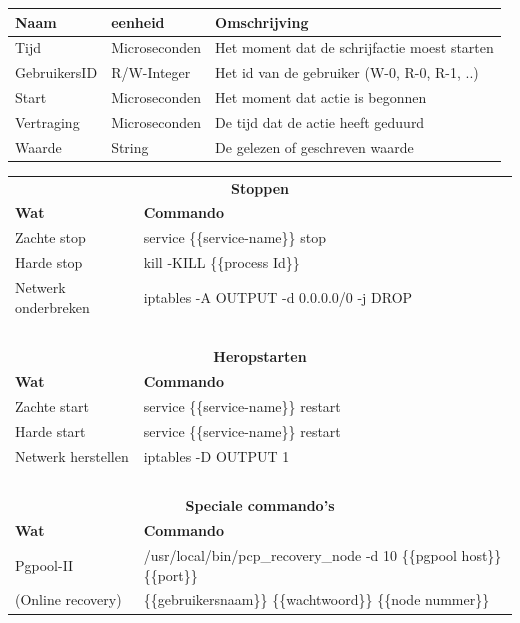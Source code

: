 \begin{table}[htbf]
\centering
		\begin{tabular}{l|l|l}
			\textbf{Naam} & \textbf{eenheid} & \textbf{Omschrijving} \\ 
			\hline Tijd & Microseconden & Het moment dat de schrijfactie moest starten\\ 
			GebruikersID & R/W-Integer & Het id van de gebruiker (W-0, R-0, R-1, ..) \\ 
			Start & Microseconden & Het moment dat actie is begonnen \\
			Vertraging & Microseconden & De tijd dat de actie heeft geduurd \\ 
			Waarde & String & De gelezen of geschreven waarde \\ 
		\end{tabular} 
	\label{table:consistentieuitvoer}
\end{table}

\begin{table}[htbf]
	\centering
		\begin{tabular}{l|l}
			\multicolumn{2}{c}{\textbf{Stoppen}} \\
			\textbf{Wat} & \textbf{Commando} \\ 
			\hline
			Zachte stop & service \{\{service-name\}\} stop \\ 
			Harde stop & kill -KILL \{\{process Id\}\} \\ 
			Netwerk onderbreken & iptables -A OUTPUT -d 0.0.0.0/0 -j DROP  \\ 
			\multicolumn{2}{c}{~} \\
			\multicolumn{2}{c}{\textbf{Heropstarten}} \\
			\textbf{Wat} & \textbf{Commando} \\ 
			\hline
			Zachte start & service \{\{service-name\}\} restart \\ 
			Harde start & service \{\{service-name\}\} restart \\ 
			Netwerk herstellen & iptables -D OUTPUT 1  \\ 
			\multicolumn{2}{c}{~}  \\
			\multicolumn{2}{c}{\textbf{Speciale commando's}} \\
			\textbf{Wat} & \textbf{Commando} \\ 
			\hline
			Pgpool-II & /usr/local/bin/pcp\_recovery\_node -d 10 \{\{pgpool host\}\} \{\{port\}\} \\
			\hspace*{0.5cm} (Online recovery) &  \hspace*{0.5cm} \{\{gebruikersnaam\}\} \{\{wachtwoord\}\}  \{\{node nummer\}\} \\
		\end{tabular} 
	\label{table:beschikbaarheidstesten-commandos}
\end{table}